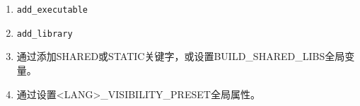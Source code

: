 

\begin{enumerate}
\item 
\begin{lstlisting}[style=styleCMake]
add_executable
\end{lstlisting}

\item 
\begin{lstlisting}[style=styleCMake]
add_library
\end{lstlisting}

\item 
通过添加SHARED或STATIC关键字，或设置BUILD\_SHARED\_LIBS全局变量。

\item 
通过设置<LANG>\_VISIBILITY\_PRESET全局属性。
\end{enumerate}